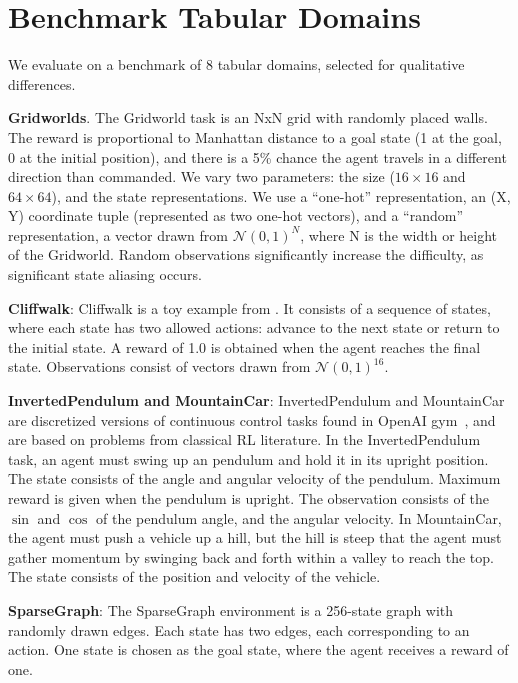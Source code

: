 \section{Benchmark Tabular Domains}
\label{app:domains}

We evaluate on a benchmark of 8 tabular domains, selected for qualitative differences.

\textbf{Gridworlds}. The Gridworld task is an NxN grid with randomly placed walls. The reward is proportional to Manhattan distance to a goal state (1 at the goal, 0 at the initial position), and there is a 5\% chance the agent travels in a different direction than commanded. We vary two parameters: the size ($16 \times 16$ and $64 \times 64$), and the state representations. We use a ``one-hot'' representation, an (X, Y) coordinate tuple (represented as two one-hot vectors), and a ``random'' representation, a vector drawn from $\mathcal{N}(0, 1)^N$, where N is the width or height of the Gridworld. Random observations significantly increase the difficulty, as significant state aliasing occurs.

\textbf{Cliffwalk}: Cliffwalk is a toy example from \citet{Schaul2015}. It consists of a sequence of states, where each state has two allowed actions: advance to the next state or return to the initial state. A reward of 1.0 is obtained when the agent reaches the final state. Observations consist of vectors drawn from $\mathcal{N}(0, 1)^{16}$.

\textbf{InvertedPendulum and MountainCar}: InvertedPendulum and MountainCar are discretized versions of continuous control tasks found in OpenAI gym~\citep{gym}, and are based on problems from classical RL literature. 
In the InvertedPendulum task, an agent must swing up an pendulum and hold it in its upright position. The state consists of the angle and angular velocity of the pendulum. Maximum reward is given when the pendulum is upright. The observation consists of the $\sin$ and $\cos$ of the pendulum angle, and the angular velocity.
In MountainCar, the agent must push a vehicle up a hill, but the hill is steep that the agent must gather momentum by swinging back and forth within a valley to reach the top. The state consists of the position and velocity of the vehicle.

\textbf{SparseGraph}: The SparseGraph environment is a 256-state graph with randomly drawn edges. Each state has two edges, each corresponding to an action. One state is chosen as the goal state, where the agent receives a reward of one.

